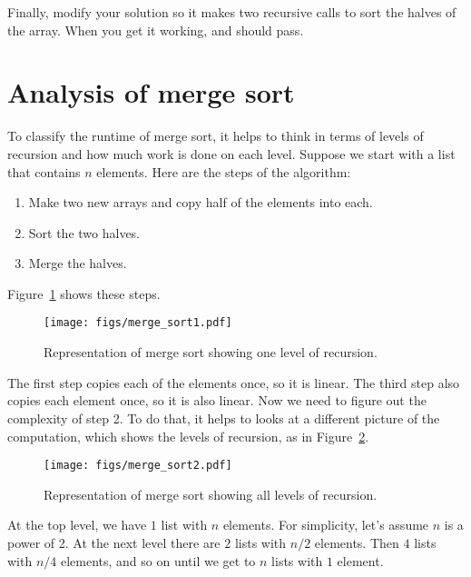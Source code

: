 \documentclass[12pt]{book}
\theoremstyle{exercise}
\begin{document}
Finally, modify your solution so it makes two recursive calls to sort
the halves of the array. When you get it working, 
and  should pass.


\section{Analysis of merge sort}
\label{analysis-of-merge-sort}


To classify the runtime of merge sort, it helps to think in terms of
levels of recursion and how much work is done on each level. Suppose
we start with a list that contains $n$ elements. Here are the steps of
the algorithm:

\begin{enumerate}

\item
  Make two new arrays and copy half of the elements into each.

\item
  Sort the two halves.

\item
  Merge the halves.

\end{enumerate}

Figure~\ref{fig-sort1}
shows these steps.

\begin{figure}
\centering
\texttt{[image: figs/merge\_sort1.pdf]}
\caption{Representation of merge sort showing one level of recursion.}
\label{fig-sort1}
\end{figure}


The first step copies each of the elements once, so it is linear. The
third step also copies each element once, so it is also linear. Now we
need to figure out the complexity of step 2. To do that, it helps to
looks at a different picture of the computation, which shows the levels
of recursion, as in Figure~\ref{fig-sort2}.

\begin{figure}
\centering
\texttt{[image: figs/merge\_sort2.pdf]}
\caption{Representation of merge sort showing all levels of recursion.}
\label{fig-sort2}
\end{figure}

At the top level, we have $1$ list with $n$ elements. 
For simplicity, let's assume $n$ is a power of 2.
At the next level there are $2$ lists with $n/2$ elements.
Then $4$ lists with $n/4$ elements, and so on until we get
to $n$ lists with $1$ element.
\end{document}
